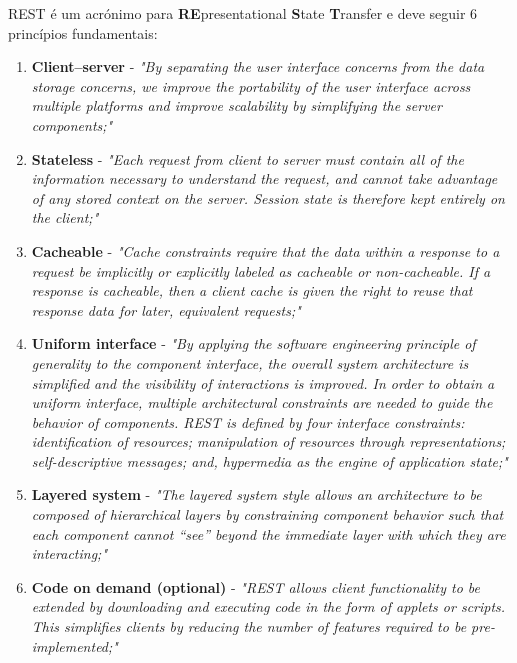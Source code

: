 REST é um acrónimo para \textbf{RE}presentational \textbf{S}tate \textbf{T}ransfer e deve seguir 6 princípios fundamentais:
\begin{enumerate}
    \item \textbf{Client–server} - \textit{"By separating the user interface concerns from the data storage concerns, we improve the portability of the user interface across multiple platforms and improve scalability by simplifying the server components;"}
    \item \textbf{Stateless} - \textit{"Each request from client to server must contain all of the information necessary to understand the request, and cannot take advantage of any stored context on the server. Session state is therefore kept entirely on the client;"}
    \item \textbf{Cacheable} - \textit{"Cache constraints require that the data within a response to a request be implicitly or explicitly labeled as cacheable or non-cacheable. If a response is cacheable, then a client cache is given the right to reuse that response data for later, equivalent requests;"}
    \item \textbf{Uniform interface} - \textit{"By applying the software engineering principle of generality to the component interface, the overall system architecture is simplified and the visibility of interactions is improved. In order to obtain a uniform interface, multiple architectural constraints are needed to guide the behavior of components. REST is defined by four interface constraints: identification of resources; manipulation of resources through representations; self-descriptive messages; and, hypermedia as the engine of application state;"}
    \item \textbf{Layered system} - \textit{"The layered system style allows an architecture to be composed of hierarchical layers by constraining component behavior such that each component cannot “see” beyond the immediate layer with which they are interacting;"}
    \item \textbf{Code on demand (optional)} - \textit{"REST allows client functionality to be extended by downloading and executing code in the form of applets or scripts. This simplifies clients by reducing the number of features required to be pre-implemented;"}
\end{enumerate}